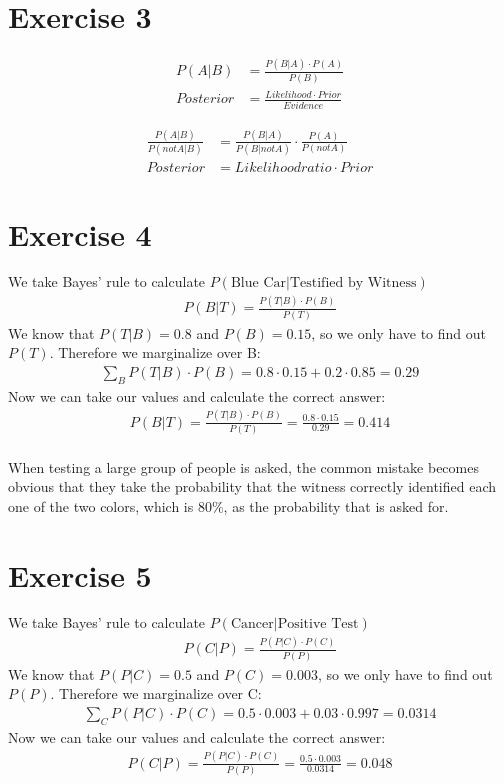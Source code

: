 \documentclass{article}
\begin{document}
\setcounter{equation}{0}
\section*{Exercise 3}

\begin{align}
P(A|B) & = \frac{P(B|A) \cdot P(A)}{P(B)} \\
Posterior & = \frac{Likelihood \cdot Prior}{Evidence}
\end{align}

\begin{align}
\frac{P(A|B)}{P(not A|B)} & = \frac{P(B|A)}{P(B|not A)} \cdot \frac{P(A)}{P(not A)} \\
Posterior & = Likelihoodratio \cdot Prior
\end{align}

\setcounter{equation}{0}
\section*{Exercise 4}

We take Bayes' rule to calculate $P(\mbox{Blue Car}|\mbox{Testified by Witness})$
\begin{align}
P(B|T) = \frac{P(T|B) \cdot P(B)}{P(T)}
\end{align}
We know that $P(T|B) = 0.8$ and $P(B) = 0.15$, so we only have to find out $P(T)$. Therefore we marginalize over B:
\begin{align}
\sum_{B}{P(T|B) \cdot P(B)} = 0.8 \cdot 0.15 + 0.2 \cdot 0.85 = 0.29
\end{align}
Now we can take our values and calculate the correct answer:
\begin{align}
P(B|T) = \frac{P(T|B) \cdot P(B)}{P(T)} = \frac{0.8 \cdot 0.15}{0.29} = 0.414
\end{align}
\\
When testing a large group of people is asked, the common mistake becomes obvious that they take the probability that the witness correctly identified each one of the two colors, which is 80\%, as the probability that is asked for.

\setcounter{equation}{0}
\section*{Exercise 5}

We take Bayes' rule to calculate $P(\mbox{Cancer}|\mbox{Positive Test})$
\begin{align}
P(C|P) = \frac{P(P|C) \cdot P(C)}{P(P)}
\end{align}
We know that $P(P|C) = 0.5$ and $P(C) = 0.003$, so we only have to find out $P(P)$. Therefore we marginalize over C:
\begin{align}
\sum_{C}{P(P|C) \cdot P(C)} = 0.5 \cdot 0.003 + 0.03 \cdot 0.997 = 0.0314
\end{align}
Now we can take our values and calculate the correct answer:
\begin{align}
P(C|P) = \frac{P(P|C) \cdot P(C)}{P(P)} = \frac{0.5 \cdot 0.003}{0.0314} = 0.048
\end{align}
\end{document}
